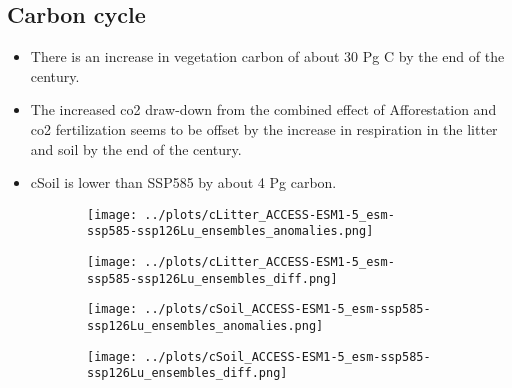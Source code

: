 \documentclass[]{article}
\begin{document}
\subsection{Carbon cycle}

\begin{itemize}
    \item There is an increase in vegetation carbon of about 30 Pg C by the end of the century.
    \item The increased co2 draw-down from the combined effect of Afforestation and co2 fertilization seems to be offset by the increase in respiration in the litter and soil by the end of the century.
    \item cSoil is lower than SSP585 by about 4 Pg carbon.
\end{itemize}

\begin{figure}[H]
    \centering
    \begin{subfigure}[b]{0.4\linewidth}
        \texttt{[image: ../plots/cLitter\_ACCESS-ESM1-5\_esm-ssp585-ssp126Lu\_ensembles\_anomalies.png]}
    \end{subfigure}
    \begin{subfigure}[b]{0.4\linewidth}
        \texttt{[image: ../plots/cLitter\_ACCESS-ESM1-5\_esm-ssp585-ssp126Lu\_ensembles\_diff.png]}
    \end{subfigure}
    \begin{subfigure}[b]{0.4\linewidth}
        \texttt{[image: ../plots/cSoil\_ACCESS-ESM1-5\_esm-ssp585-ssp126Lu\_ensembles\_anomalies.png]}
    \end{subfigure}
    \begin{subfigure}[b]{0.4\linewidth}
        \texttt{[image: ../plots/cSoil\_ACCESS-ESM1-5\_esm-ssp585-ssp126Lu\_ensembles\_diff.png]}
    \end{subfigure}
    \begin{subfigure}[b]{0.4\linewidth}

\end{subfigure}
\end{figure}
\end{document}
